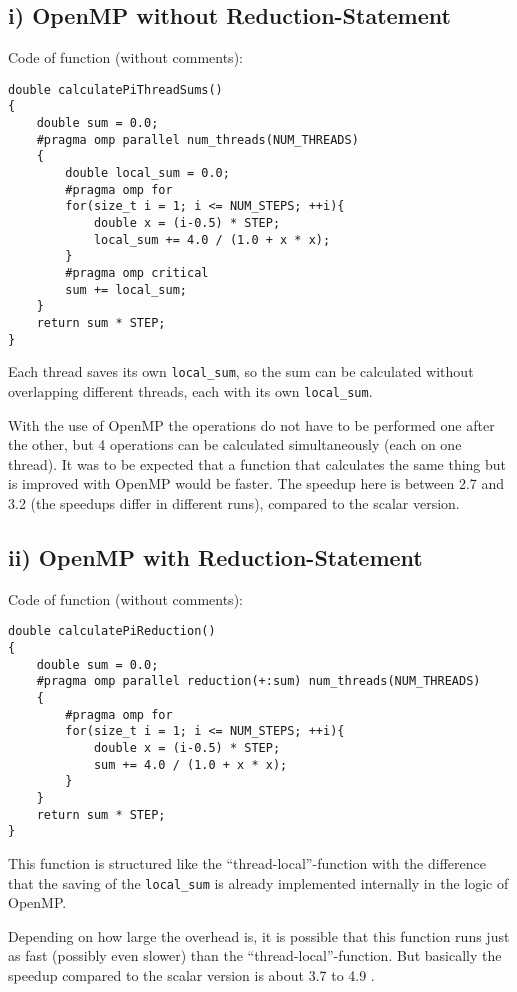 \documentclass[a4paper]{article}
\begin{document}
\subsection*{i) OpenMP without Reduction-Statement}
Code of function (without comments):
\begin{lstlisting}
double calculatePiThreadSums() 
{
    double sum = 0.0;
    #pragma omp parallel num_threads(NUM_THREADS)
    {
        double local_sum = 0.0;
        #pragma omp for
        for(size_t i = 1; i <= NUM_STEPS; ++i){
            double x = (i-0.5) * STEP;
            local_sum += 4.0 / (1.0 + x * x);
        }
        #pragma omp critical
        sum += local_sum;
    }
    return sum * STEP;
}
\end{lstlisting}
Each thread saves its own \lstinline{local_sum}, so the sum can be calculated without overlapping different threads, each with its own \lstinline{local_sum}.

With the use of OpenMP the operations do not have to be performed one after the other, but 4 operations can be calculated simultaneously (each on one thread).
It was to be expected that a function that calculates the same thing but is improved with OpenMP would be faster. The speedup here is between 2.7 and 3.2 (the speedups differ in different runs), compared to the scalar version.

\subsection*{ii) OpenMP with Reduction-Statement}
Code of function (without comments):
\begin{lstlisting}
double calculatePiReduction() 
{
    double sum = 0.0;
    #pragma omp parallel reduction(+:sum) num_threads(NUM_THREADS)
    {
        #pragma omp for
        for(size_t i = 1; i <= NUM_STEPS; ++i){
            double x = (i-0.5) * STEP;
            sum += 4.0 / (1.0 + x * x);
        }
    }
    return sum * STEP;
}
\end{lstlisting}
This function is structured like the “thread-local”-function with the difference that the saving of the \lstinline{local_sum} is already implemented internally in the logic of OpenMP.

Depending on how large the overhead is, it is possible that this function runs just as fast (possibly even slower) than the “thread-local”-function. But basically the speedup compared to the scalar version is about 3.7 to 4.9 . 
\end{document}
